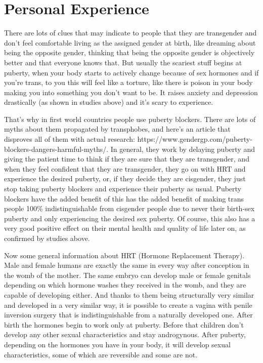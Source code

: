 \documentclass[12 pt, a4paper]{article}
\begin{document}
\section{Personal Experience}

There are lots of clues that may indicate to people that they are transgender and don't feel comfortable living as the assigned gender at birth, like dreaming about being the opposite gender, thinking that being the opposite gender is objectively better and that everyone knows that. But usually the scariest stuff begins at puberty, when your body starts to actively change because of sex hormones and if you're trans, to you this will feel like a torture, like there is poison in your body making you into something you don't want to be. It raises anxiety and depression drastically (as shown in studies above) and it's scary to experience.  

That's why in first world countries people use puberty blockers. There are lots of myths about them propagated by transphobes, and here's an article that disproves all of them with actual research: https://www.gendergp.com/puberty-blockers-dangers-harmful-myths/. In general, they work by delaying puberty and giving the patient time to think if they are sure that they are transgender, and when they feel confident that they are transgender, they go on with HRT and experience the desired puberty, or, if they decide they are cisgender, they just stop taking puberty blockers and experience their puberty as usual. Puberty blockers have the added benefit of this has the added benefit of making trans people 100\% indistinguishable from cisgender people due to never their birth-sex puberty and only experiencing the desired sex puberty. Of course, this also has a very good positive effect on their mental health and quality of life later on, as confirmed by studies above. 

Now some general information about HRT (Hormone Replacement Therapy). Male and female humans are exactly the same in every way after conception in the womb of the mother. The same embryo can develop male or female genitals depending on which hormone washes they received in the womb, and they are capable of developing either. And thanks to them being structurally very similar and developed in a very similar way, it is possible to create a vagina with penile inversion surgery that is indistinguishable from a naturally developed one. After birth the hormones begin to work only at puberty. Before that children don't develop any other sexual characteristics and stay androgynous. After puberty, depending on the hormones you have in your body, it will develop sexual characteristics, some of which are reversible and some are not. 
\end{document}
